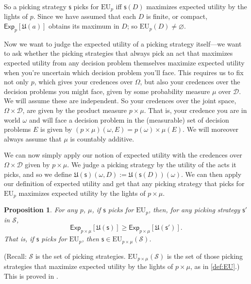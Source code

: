\documentclass[a4paper]{article}
\newtheorem{proposition}[theorem]{Proposition}
\newcommand\Exp{\mathsf{Exp}}
\newcommand\EU{\mathrm{EU}}
\newcommand\U{\mathfrak{U}} %
\newcommand{\D}{\mathcal{D}}
\renewcommand\S{\mathcal{S}}
\newcommand\s{\mathsf{s}}
\newcommand{\todoold}[2][]{\todo[backgroundcolor=white,bordercolor=orange!10,linecolor=gray!10, #1,caption={},textcolor=gray]{Pre-rev: #2}}
\newcommand{\Strategies}{\S}
\renewcommand{\emptyset}{\varnothing}
\renewcommand{\geq}{\geqslant}
\newenvironment{CCM rewritten}
{\begingroup\color{blue}} %
{\endgroup}              %
\begin{document}

So a picking strategy $\s$ picks for $\EU_p$ iff $\s(D)$ maximizes expected utility by the lights of $p$.
Since we have assumed that each $D$ is finite, or compact, $\Exp_p[\U(a)]$ obtains its maximum in $D$; so $\EU_p(D)\neq\emptyset$. 

Now we want to judge the expected utility of a picking strategy itself---we want to ask whether the picking strategies that always pick an act that maximizes expected utility from any decision problem themselves maximize expected utility when you're uncertain which decision problem you'll face. This requires us to fix not only $p$, which gives your credences over $\Omega$, but also your credences over the decision problems you might face, given by some probability measure $\mu$ over $\D$. We will assume these are independent. %
{So your credences over the joint space, $\Omega\times\D$, are given by the product measure $p\times\mu$. That is, your credence you are in world $\omega$ and will face a decision problem in the (measurable) set of decision problems $E$ is given by $(p\times\mu)(\omega,E)=p(\omega)\times\mu(E)$.} 
We will moreover always assume that $\mu$ is countably additive. 


We can now simply apply our notion of expected utility with the credences over $\Omega\times\D$ given by %
{$p\times\mu$.} We judge a picking strategy by the utility of the acts it picks, and so we define $\U(\s)(\omega,D):=\U(\s(D))(\omega)$. We can then apply our definition of expected utility and get that any picking strategy that picks for $\EU_p$ maximizes expected utility by the lights of %
{ $p\times\mu$.}
\begin{proposition}\label{thm:eu-self-rec}
	For any $p$, $\mu$, if $\s$ picks for $\EU_p$, then, for any picking strategy $\s'$ in $\S$,
	$$\Exp_{p\times\mu}[\U(\s)]\geq\Exp_{p\times\mu}[\U(\s')].$$
	That is, if $\s$ picks for $\EU_p$, then $\s\in\EU_{p\times\mu}(\Strategies)$. 
	\end{proposition}
(Recall: 
$\Strategies$ is the set of picking strategies. $\EU_{p\times \mu}(\Strategies)$ is the set of those picking strategies that maximize expected utility by the lights of %
{$p\times\mu$}, as in \cref{def:EU}.) This is proved in .
\end{document}
